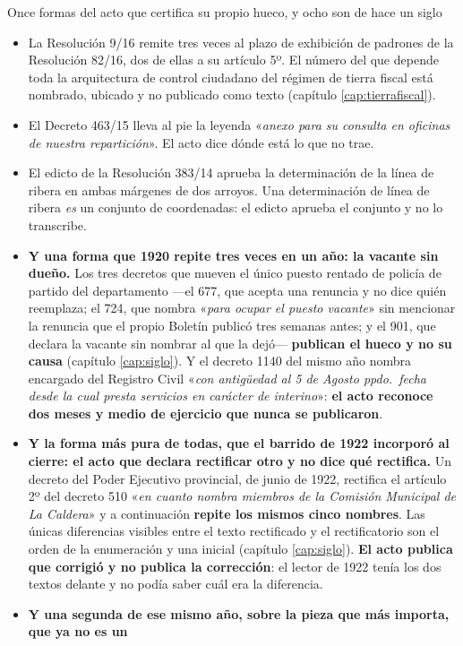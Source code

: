 \begin{ficha}{Once formas del acto que certifica su propio hueco, y ocho son de hace un siglo}
\begin{itemize}[leftmargin=*,nosep]
\item La Resolución 9/16 remite tres veces al plazo de exhibición de padrones de la Resolución
82/16, dos de ellas a su artículo 5º. El número del que depende toda la arquitectura de control
ciudadano del régimen de tierra fiscal está nombrado, ubicado y no publicado como texto
(capítulo \ref{cap:tierrafiscal}).
\item El Decreto 463/15 lleva al pie la leyenda «\textit{anexo para su consulta en oficinas de
nuestra repartición}». El acto dice dónde está lo que no trae.
\item El edicto de la Resolución 383/14 aprueba la determinación de la línea de ribera en ambas
márgenes de dos arroyos. Una determinación de línea de ribera \textit{es} un conjunto de
coordenadas: el edicto aprueba el conjunto y no lo transcribe.
\item \textbf{Y una forma que 1920 repite tres veces en un año: la vacante sin dueño.} Los tres
decretos que mueven el único puesto rentado de policía de partido del departamento ---el 677, que
acepta una renuncia y no dice quién reemplaza; el 724, que nombra «\textit{para ocupar el puesto
vacante}» sin mencionar la renuncia que el propio Boletín publicó tres semanas antes; y el 901,
que declara la vacante sin nombrar al que la dejó--- \textbf{publican el hueco y no su causa}
(capítulo \ref{cap:siglo}). Y el decreto 1140 del mismo año nombra encargado del Registro Civil
«\textit{con antigüedad al 5 de Agosto ppdo.\ fecha desde la cual presta servicios en carácter de
interino}»: \textbf{el acto reconoce dos meses y medio de ejercicio que nunca se publicaron}.
\item \textbf{Y la forma más pura de todas, que el barrido de 1922 incorporó al cierre: el acto
que declara rectificar otro y no dice qué rectifica.} Un decreto del Poder Ejecutivo provincial,
de junio de 1922, rectifica el artículo 2º del decreto 510 «\textit{en cuanto nombra miembros de
la Comisión Municipal de La Caldera}» y a continuación \textbf{repite los mismos cinco nombres}.
Las únicas diferencias visibles entre el texto rectificado y el rectificatorio son el orden de la
enumeración y una inicial (capítulo \ref{cap:siglo}). \textbf{El acto publica que corrigió y no
publica la corrección}: el lector de 1922 tenía los dos textos delante y no podía saber cuál era
la diferencia.
\item \textbf{Y una segunda de ese mismo año, sobre la pieza que más importa, que ya no es un
}
\end{itemize}
\end{ficha}
